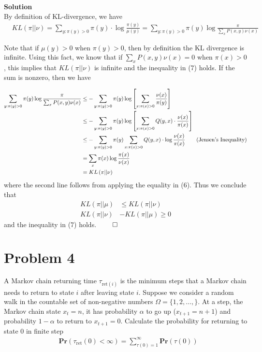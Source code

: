 \documentclass[5pt]{article}
\newcommand{\pr}{\mathbf{Pr}}
\newcommand{\ypi}{y: \pi(y) > 0}
\newcommand{\xpi}{x: \pi(x) > 0}
\begin{document}
\textbf{Solution} \\
By definition of KL-divergence, we have
\begin{align*}
	& KL \left( \pi || \nu \right) = \sum_{\ypi} \pi(y) \cdot \log \frac{\pi(y)}{\mu(y)} 
	= \sum_{\ypi} \pi(y) \log \frac{\pi}{\sum_{x} P(x,y) \nu(x)}
\end{align*} 

Note that if $\mu(y) > 0$ when $\pi(y) > 0$, then by definition the KL divergence is infinite. Using this fact, we know that if
$\sum_{x} P(x,y) \nu(x) = 0$ when $\pi(x) > 0$, this implies that $KL(\pi || \nu)$ is infinite and the inequality in (7) holds. If the sum is nonzero, then we have

\begin{align*}
	\sum_{\ypi} \pi(y) \log \frac{\pi}{\sum_{x} P(x,y) \nu(x)}
	&\leq - \sum_{\ypi} \pi(y) \log \left[\sum_{\xpi} \frac{\nu(x)}{\pi(y)} \right]\\
	&\leq - \sum_{\ypi} \pi(y) \log \left[ \sum_{\xpi} Q(y,x) \cdot \frac{\nu(x)}{\pi(x)} \right] \\
	&\leq - \sum_{\ypi} \pi(y) \sum_{\xpi} Q(y,x) \cdot \log \frac{\nu(x)}{\pi(x)} \qquad \textnormal{(Jensen's Inequality)} \\
	&= \sum_{x} \pi(x) \log \frac{\pi(x)}{\nu(x)} \\
	&= KL \left( \pi || \nu \right)
\end{align*}
where the second line follows from applying the equality in (6). Thus we conclude that
\begin{align*}
	KL \left( \pi || \mu \right) & \leq KL \left( \pi || \nu \right) \\
	KL \left( \pi || \nu \right) &- KL \left( \pi || \mu \right) \geq 0
\end{align*}
and the inequality in (7) holds. \hfill $\qed$

\pagebreak


\section{Problem 4}
A Markov chain returning time $\tau_{\mathrm{ret}(i)}$ is the minimum steps that a Markov chain needs to return to state $i$ after leaving state $i$. Suppose we consider a random walk in the countable set of non-negative numbers $\Omega = \{ 1, 2, \ldots,  \}$. At a step, the Markov chain state $x_t = n$, it has probability $\alpha$ to go up ($x_{t+1} = n + 1$) and probability $1 - \alpha$ to return to $x_{t+1} = 0$. Calculate the probability for returning to state 0 in finite step
\begin{align}
	& \pr \left( \tau_{\mathrm{ret}}(0) < \infty \right) = \sum_{\tau(0) = 1}^{\infty} \pr \left( \tau(0) \right)
\end{align}
\end{document}
